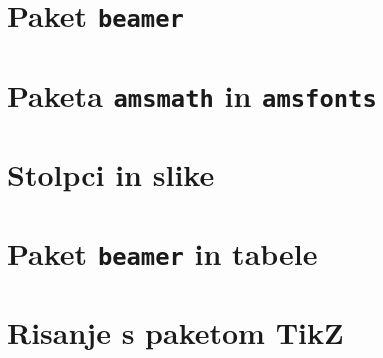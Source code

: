 \documentclass{beamer}
\begin{document}


\section{Paket \texttt{beamer}}

\section{Paketa \texttt{amsmath} in \texttt{amsfonts}}

\section{Stolpci in slike}

\section{Paket \texttt{beamer} in tabele}

\section{Risanje s paketom TikZ}
\end{document}
